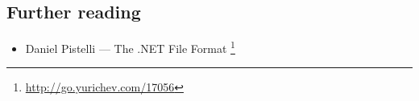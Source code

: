 \subsection{Further reading}

\begin{itemize}
\item
Daniel Pistelli --- The .NET File Format \footnote{\url{http://go.yurichev.com/17056}}
\end{itemize}

